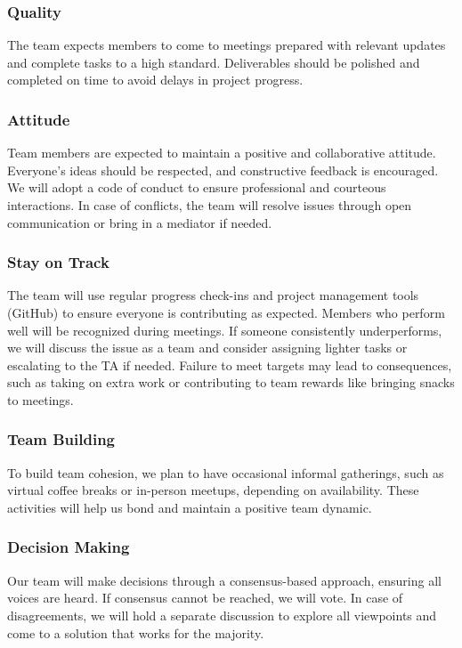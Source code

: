 \documentclass{article}
\begin{document}
\subsubsection*{Quality} 

The team expects members to come to meetings prepared with relevant updates and complete tasks
to a high standard. Deliverables should be polished and completed on time to avoid delays in
project progress.

\subsubsection*{Attitude}

Team members are expected to maintain a positive and collaborative attitude. Everyone's ideas
should be respected, and constructive feedback is encouraged. We will adopt a code of conduct
to ensure professional and courteous interactions. In case of conflicts, the team will resolve
issues through open communication or bring in a mediator if needed.

\subsubsection*{Stay on Track}

The team will use regular progress check-ins and project management tools (GitHub)
to ensure everyone is contributing as expected. Members who perform well will be recognized during
meetings. If someone consistently underperforms, we will discuss the issue as a team and consider
assigning lighter tasks or escalating to the TA if needed. Failure to meet targets may lead to
consequences, such as taking on extra work or contributing to team rewards like bringing snacks to meetings.

\subsubsection*{Team Building}

To build team cohesion, we plan to have occasional informal gatherings, such as virtual coffee breaks
or in-person meetups, depending on availability. These activities will help us bond and maintain a 
positive team dynamic.

\subsubsection*{Decision Making} 

Our team will make decisions through a consensus-based approach, ensuring all voices are heard. If
consensus cannot be reached, we will vote. In case of disagreements, we will hold a separate discussion
to explore all viewpoints and come to a solution that works for the majority.
\end{document}
